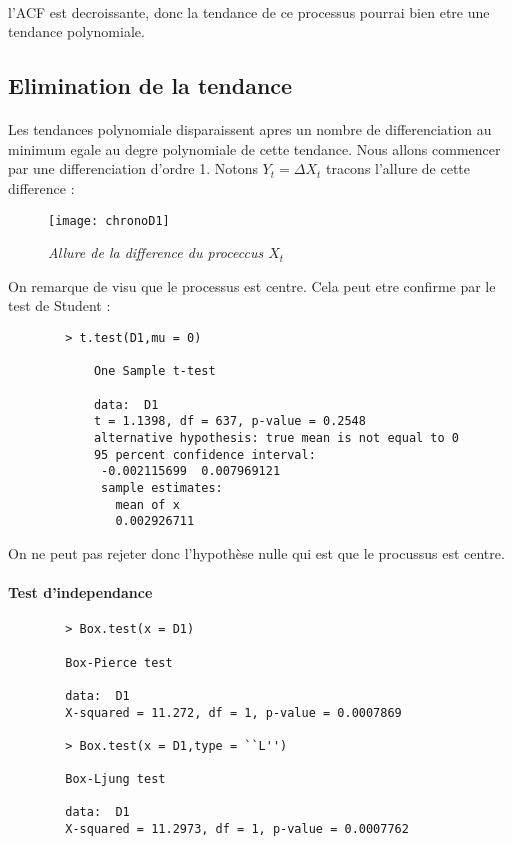         \paragraph{}l'ACF est decroissante, donc la tendance de ce processus
        pourrai bien etre une tendance polynomiale. 
        

    \subsection{Elimination de la tendance}
        \paragraph{} Les tendances polynomiale disparaissent apres un nombre de
        differenciation au minimum egale au degre polynomiale de cette tendance.
        Nous allons commencer par une differenciation d'ordre 1. Notons $Y_t=\Delta X_t$
        tracons l'allure de cette difference :

        \begin{figure}[H]
            \centering 
            \label{fig:chronoD1} 
            \texttt{[image: chronoD1]} 
            \caption{\it Allure de la difference du proceccus $X_t$ } 
        \end{figure} 

        On remarque de visu que le processus est centre. Cela peut etre confirme par
        le test de Student :
        \begin{verbatim}
        > t.test(D1,mu = 0)

            One Sample t-test

            data:  D1
            t = 1.1398, df = 637, p-value = 0.2548
            alternative hypothesis: true mean is not equal to 0
            95 percent confidence interval:
             -0.002115699  0.007969121
             sample estimates:
               mean of x 
               0.002926711 

        \end{verbatim}
        On ne peut pas rejeter donc l'hypothèse nulle qui est que le procussus
        est centre.
        \paragraph{Test d'independance}

        \begin{verbatim}
        > Box.test(x = D1)

        Box-Pierce test

        data:  D1
        X-squared = 11.272, df = 1, p-value = 0.0007869

        > Box.test(x = D1,type = ``L'')

        Box-Ljung test

        data:  D1
        X-squared = 11.2973, df = 1, p-value = 0.0007762

        \end{verbatim}
        
